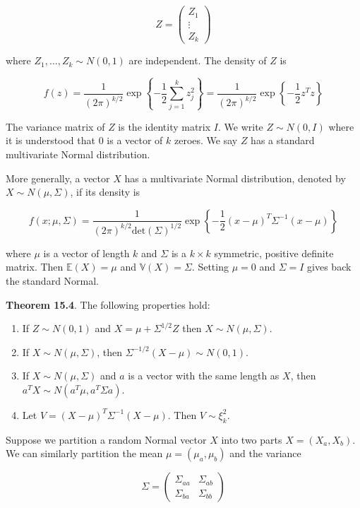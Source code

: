 \[ Z = \begin{pmatrix} Z_1 \\ \vdots \\ Z_k \end{pmatrix} \]

where \(Z_1, \dots, Z_k \sim N(0, 1)\) are independent. The density of
\(Z\) is

\[ f(z) = \frac{1}{(2\pi)^{k / 2}} \exp \left\{ -\frac{1}{2} \sum_{j=1}^k z_j^2 \right\} = \frac{1}{(2\pi)^{k / 2}} \exp \left\{ -\frac{1}{2} z^T z \right\}\]

The variance matrix of \(Z\) is the identity matrix \(I\). We write
\(Z \sim N(0, I)\) where it is understood that \(0\) is a vector of
\(k\) zeroes. We say \(Z\) has a standard multivariate Normal
distribution.

More generally, a vector \(X\) has a multivariate Normal distribution,
denoted by \(X \sim N(\mu, \Sigma)\), if its density is

\[ f(x; \mu, \Sigma) = \frac{1}{(2 \pi)^{k / 2} \text{det}(\Sigma)^{1/2}} \exp \left\{ -\frac{1}{2} (x - \mu)^T \Sigma^{-1} (x - \mu)\right\}\]

where \(\mu\) is a vector of length \(k\) and \(\Sigma\) is a
\(k \times k\) symmetric, positive definite matrix. Then
\(\mathbb{E}(X) = \mu\) and \(\mathbb{V}(X) = \Sigma\). Setting
\(\mu = 0\) and \(\Sigma = I\) gives back the standard Normal.

\textbf{Theorem 15.4}. The following properties hold:

\begin{enumerate}[label={\arabic*.}]
\item
  If \(Z \sim N(0, 1)\) and \(X = \mu + \Sigma^{1/2} Z\) then
  \(X \sim N(\mu, \Sigma)\).
\item
  If \(X \sim N(\mu, \Sigma)\), then
  \(\Sigma^{-1/2}(X - \mu) \sim N(0, 1)\).
\item
  If \(X \sim N(\mu, \Sigma)\) and \(a\) is a vector with the same
  length as \(X\), then \(a^T X \sim N(a^T \mu, a^T \Sigma a)\).
\item
  Let \(V = (X - \mu)^T \Sigma^{-1} (X - \mu)\). Then
  \(V \sim \xi_k^2\).
\end{enumerate}

Suppose we partition a random Normal vector \(X\) into two parts
\(X = (X_a, X_b)\). We can similarly partition the mean
\(\mu = (\mu_a, \mu_b)\) and the variance

\[\Sigma = \begin{pmatrix} 
\Sigma_{aa} & \Sigma_{ab} \\
\Sigma_{ba} & \Sigma_{bb}
\end{pmatrix}\]

